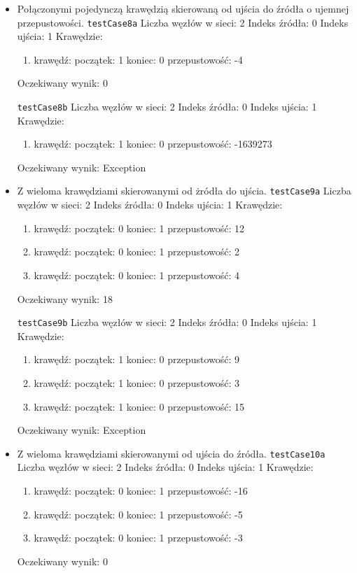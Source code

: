 \begin{itemize}[nosep]
    \item Połączonymi pojedynczą krawędzią skierowaną od ujścia do źródła o ujemnej przepustowości.
    \texttt{testCase8a}
    Liczba węzłów w sieci: 2
    Indeks źródła: 0
    Indeks ujścia: 1
    Krawędzie:
    \begin{enumerate}[nosep]
        \item krawędź:
        początek: 1
        koniec: 0
        przepustowość: -4
    \end{enumerate}
    Oczekiwany wynik: 0

    \texttt{testCase8b}
    Liczba węzłów w sieci: 2
    Indeks źródła: 0
    Indeks ujścia: 1
    Krawędzie:
    \begin{enumerate}[nosep]
        \item krawędź:
        początek: 1
        koniec: 0
        przepustowość: -1639273
    \end{enumerate}
    Oczekiwany wynik: Exception

    \item Z wieloma krawędziami skierowanymi od żródła do ujścia.
    \texttt{testCase9a}
    Liczba węzłów w sieci: 2
    Indeks źródła: 0
    Indeks ujścia: 1
    Krawędzie:
    \begin{enumerate}[nosep]
        \item krawędź:
        początek: 0
        koniec: 1
        przepustowość: 12
        \item krawędź:
        początek: 0
        koniec: 1
        przepustowość: 2
        \item krawędź:
        początek: 0
        koniec: 1
        przepustowość: 4
    \end{enumerate}
    Oczekiwany wynik: 18

    \texttt{testCase9b}
    Liczba węzłów w sieci: 2
    Indeks źródła: 0
    Indeks ujścia: 1
    Krawędzie:
    \begin{enumerate}[nosep]
        \item krawędź:
        początek: 1
        koniec: 0
        przepustowość: 9
        \item krawędź:
        początek: 1
        koniec: 0
        przepustowość: 3
        \item krawędź:
        początek: 1
        koniec: 0
        przepustowość: 15
    \end{enumerate}
    Oczekiwany wynik: Exception

    \item Z wieloma krawędziami skierowanymi od ujścia do źródła.
    \texttt{testCase10a}
    Liczba węzłów w sieci: 2
    Indeks źródła: 0
    Indeks ujścia: 1
    Krawędzie:
    \begin{enumerate}[nosep]
        \item krawędź:
        początek: 0
        koniec: 1
        przepustowość: -16
        \item krawędź:
        początek: 0
        koniec: 1
        przepustowość: -5
        \item krawędź:
        początek: 0
        koniec: 1
        przepustowość: -3
    \end{enumerate}
    Oczekiwany wynik: 0


\end{itemize}
